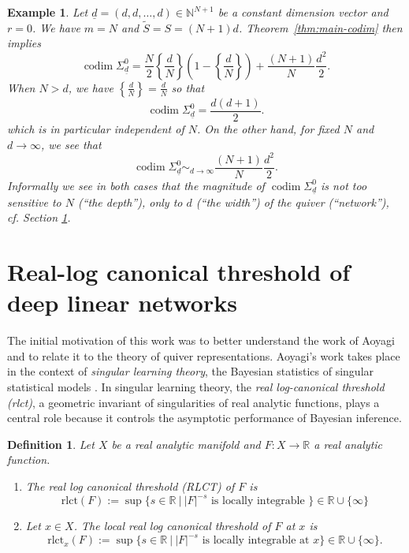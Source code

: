 \documentclass[a4paper]{amsart}
\DeclareMathOperator{\codim}{\mathrm{codim}}
\newcommand{\R}{\mathbb{R}}
\newcommand{\N}{\mathbb{N}}
\newcommand{\ud}{\underline{d}}
\newcommand{\rlct}{\mathrm{rlct}}
\newtheorem{defn}[thm]{Definition}
\theoremstyle{plain}
\newtheorem{example}[thm]{Example}
\begin{document}
\begin{example} \rm
    Let $\ud=(d,d,\ldots,d)\in \N^{N+1}$ be a constant dimension vector and $r=0$. We have $m=N$ and $\tilde{S}=S=(N+1)d$. Theorem~\ref{thm:main-codim} then implies
    \[
    \codim \Sigma^0_{\ud} = \frac{N}{2}\left\{\frac{d}{N} \right\}\left(1-\left\{\frac{d}{N} \right\}\right) + \frac{(N+1)}{N}\frac{d^2}{2}.
    \]
   When $N>d$, we have $\left\{\frac{d}{N} \right\}=\frac{d}{N}$ so that
   \[
     \codim \Sigma^0_{\ud}=\frac{d(d+1)}{2}.
   \]
   which is in particular independent of $N$. On the other hand, for fixed $N$ and $d\to\infty$, we see that
   \[
   \codim \Sigma^0_{\ud} \sim_{d\to\infty} \frac{(N+1)}{N}\frac{d^2}{2}.
   \]
    Informally we see in both cases that the magnitude of $\codim \Sigma_{\ud}^0$ is not too sensitive to $N$ (``the depth''), only to $d$ (``the width'') of the quiver (``network''), cf. Section \ref{sec:RLCT}.
\end{example} 


\section{Real-log canonical threshold of deep linear networks} %
\label{sec:RLCT}

The initial motivation of this work was to better understand the work of Aoyagi \cite{aoyagi} and to relate it to the theory of quiver representations. Aoyagi's work takes place in the context of \emph{singular learning theory}, the Bayesian statistics of singular statistical models \cite{watanabe2009,watanabe2018,watanabe2024recent}. In singular learning theory, the \emph{real log-canonical threshold (rlct)}, a geometric invariant of singularities of real analytic functions, plays a central role because it controls the asymptotic performance of Bayesian inference.

\begin{defn}\label{defn:rlct}
Let $X$ be a real analytic manifold and $F:X\to \R$ a real analytic function.
\begin{enumerate}[label=(\roman*)]
        \item The \emph{real log canonical threshold} (RLCT) of $F$ is
        \[
        \rlct(F):=\sup \{s\in \R\ |\ |F|^{-s}\text{ is locally integrable }\}\in \R\cup\{\infty\}
        \]
        \item Let $x\in X$. The \emph{local real log canonical threshold} of $F$ at $x$ is
         \[
        \rlct_x(F):=\sup \{s\in \R\ |\ |F|^{-s}\text{ is locally integrable at $x$}\}\in \R\cup\{\infty\}.
        \]
    \end{enumerate}
\end{defn}
\end{document}
